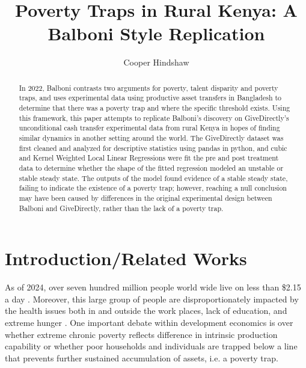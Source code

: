 \documentclass[9pt,twoside]{pnas-new}
\begin{document}
\title{Poverty Traps in Rural Kenya: A Balboni Style Replication}

\author[a]{Cooper Hindshaw}



\begin{abstract}

In 2022, Balboni contrasts two arguments for poverty, talent disparity and poverty
traps, and uses experimental data using productive asset transfers in Bangladesh to determine
that there was a poverty trap and where the specific threshold exists. Using this framework, this
paper attempts to replicate Balboni's discovery on GiveDirectly's unconditional cash transfer
experimental data from rural Kenya in hopes of finding similar dynamics in another setting
around the world. The GiveDirectly dataset was first cleaned and analyzed for descriptive
statistics using pandas in python, and cubic and Kernel Weighted Local Linear Regressions were
fit the pre and post treatment data to determine whether the shape of the fitted regression
modeled an unstable or stable steady state. The outputs of the model found evidence of a stable
steady state, failing to indicate the existence of a poverty trap; however, reaching a null
conclusion may have been caused by differences in the original experimental design between
Balboni and GiveDirectly, rather than the lack of a poverty trap.

\end{abstract}


\maketitle
\thispagestyle{firststyle}

{}
{}

\Firstpage



\section{Introduction/Related Works}

As of 2024, over seven hundred million people world wide live on less than \$2.15 a day
\cite{worldbank2024}. Moreover, this large group of people are disproportionately impacted by
the health issues both in and outside the work places, lack of education, and extreme hunger
\cite{murray2006}. One important debate within development economics is over whether extreme
chronic poverty reflects difference in intrinsic production capability or whether poor households
and individuals are trapped below a line that prevents further sustained accumulation of assets,
i.e. a poverty trap. 
\end{document}

